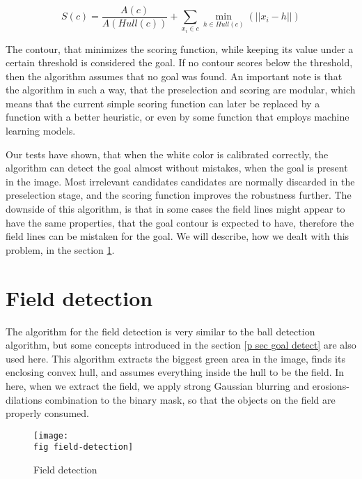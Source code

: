 \begin{equation*}
  S(c)=\frac{A(c)}{A(Hull(c))}+\displaystyle\sum_{x_i \in c}\min_{h \in Hull(c)
  }(||x_i-h||)
\end{equation*}

The contour, that minimizes the scoring function, while keeping its value under
a certain threshold is considered the goal. If no contour scores below the
threshold, then the algorithm assumes that no goal was found. An important note
is that the algorithm in such a way, that the preselection and scoring are
modular, which means that the current simple scoring function can later be
replaced by a function with a better heuristic, or even by some function that
employs machine learning models.

Our tests have shown, that when the white color is calibrated correctly, the
algorithm can detect the goal almost without mistakes, when the goal is present
in the image. Most irrelevant candidates candidates are normally discarded in
the preselection stage, and the scoring function improves the robustness
further. The downside of this algorithm, is that in some cases the field lines
might appear to have the same properties, that the goal contour is expected to
have, therefore the field lines can be mistaken for the goal. We will describe,
how we dealt with this problem, in the section \ref{p sec field detect}.

\section{Field detection}
\label{p sec field detect}

The algorithm for the field detection is very similar to the ball detection
algorithm, but some concepts introduced in the section \ref{p sec goal detect}
are also used here. This algorithm extracts the biggest green area in the
image, finds its enclosing convex hull, and assumes everything inside the hull
to be the field. In here, when we extract the field, we apply strong Gaussian
blurring and erosions-dilations combination to the binary mask, so that the
objects on the field are properly consumed.

\begin{figure}[ht]
  \texttt{[image: \\fig field-detection]}
  \caption{Field detection}
  \label{p figure field-detection}
\end{figure}

